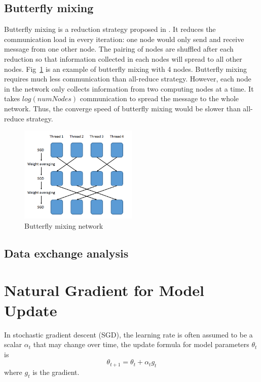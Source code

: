 \documentclass{article}
\begin{document}
\subsection{Butterfly mixing}
Butterfly mixing is a reduction strategy proposed in \cite{zhao2013butterfly}. It reduces the communication load in 
every iteration: one node would only send and receive message from one other node. The pairing of nodes are shuffled after
each reduction so that information collected in each nodes will spread to all other nodes. Fig~\ref{fig:butterfly} 
is an example of butterfly mixing with 4 nodes. Butterfly mixing requires much less communication than all-reduce 
strategy. However, each node in the network only collects information from two computing nodes at a time.
It takes $log(numNodes)$ communication to spread the message to the whole network. Thus, the converge speed 
of butterfly mixing would be slower than all-reduce strategy. 
\begin{figure}[htb]
  \centering
  \includegraphics[width=0.5\textwidth]{butterfly.png}
  \caption{Butterfly mixing network}
  \label{fig:butterfly}
\end{figure}

\subsection{Data exchange analysis}

\section{Natural Gradient for Model Update}
In stochastic gradient descent (SGD), the learning rate is often assumed to be a scalar $\alpha_t$ that may change over time,
the update formula for model parameters $\theta_{t}$ is
\begin{equation}
\theta_{t+1} = \theta_{t} + \alpha_t g_t
\end{equation}
where $g_t$ is the gradient.
\end{document}
